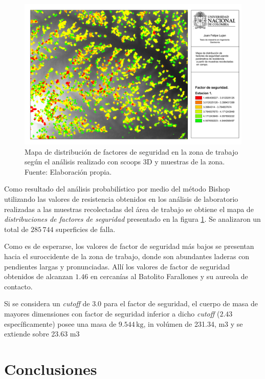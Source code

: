 \begin{figure}[H]
\centering
\includegraphics[scale=0.3]{img/fos3DCampo.pdf}
\caption{Mapa de distribuci\'on de factores de seguridad en la zona de trabajo seg\'un el an\'alisis realizado con scoops 3D y muestras de la zona. Fuente: Elaboraci\'on propia.}
\label{fig:fos3dout}
\end{figure}

Como resultado del an\'alisis probabil\'istico por medio del m\'etodo Bishop utilizando las valores de resistencia obtenidos en los an\'alisis de laboratorio realizadas a las muestras recolectadas del \'area de trabajo se obtiene el mapa de \emph{distribuciones de factores de seguridad} presentado en la figura \ref{fig:fos3dout}.
Se analizaron un total de \(285\,744\) superficies de falla.

Como es de esperarse, los valores de factor de seguridad m\'as bajos se presentan hacia el suroccidente de la zona de trabajo, donde  son abundantes laderas con pendientes  largas y pronunciadas. All\'i los valores de factor de seguridad obtenidos de alcanzan \(1.46\) en cercan\'ias al Batolito Farallones y su aureola de contacto.

Si se considera un \textit{cutoff} de 3.0 para el factor de seguridad, el cuerpo de masa de mayores dimensiones con factor de seguridad  inferior a dicho \textit{cutoff} ($2.43$ espec\'ificamente) posee una masa de $9.544\,\text{kg}$, in vol\'umen de 231.34, m3 y se extiende sobre 23.63 m3



\section{Conclusiones}


